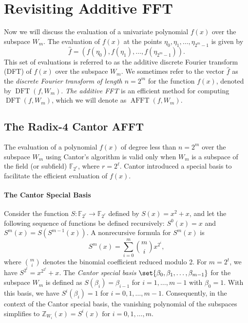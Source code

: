 \documentclass[11pt,runningheads]{llncs}
\DeclareMathOperator{\dft}{DFT} %
\DeclareMathOperator{\fft}{AFFT} %
\begin{document}
\section{Revisiting Additive FFT}
Now we will discuss the evaluation of a univariate polynomial $f(x)$ over the subspace $W_m$. The evaluation of $f(x)$ at the points $\eta_0, \eta_1, \ldots, \eta_{2^m-1}$ is given by 
\begin{equation*}
    \hat{f} = \left( f(\eta_0), f(\eta_1), \ldots, f(\eta_{2^m-1}) \right).
\end{equation*}
This set of evaluations is referred to as the additive discrete Fourier transform (DFT) of $f(x)$ over the subspace $W_m$. We sometimes refer to the vector $\hat{f}$ as the \textit{discrete Fourier transform of length $n=2^m$} for the function $f(x)$, denoted by $\dft(f, W_m)$. \textit{The additive FFT} is an efficient method for computing $\dft(f, W_m)$, which we will denote as $\fft(f, W_m)$.


\subsection{The Radix-4 Cantor AFFT}

The evaluation of a polynomial $f(x)$ of degree less than $n = 2^m$ over the subspace $W_m$ using Cantor's algorithm is valid only when $W_m$ is a subspace of the field (or subfield) $\mathbb{F}_{2^r}$, where $r = 2^\ell$. Cantor introduced a special basis to facilitate the efficient evaluation of $f(x)$.

\paragraph{The Cantor Special Basis}
Consider the function $S:\mathbb{F}_{2^r} \rightarrow \mathbb{F}_{2^r}$ defined by $S(x)=x^2+x$, and let the following sequence of functions be defined recursively: $S^{0}(x)=x$ and $S^{m}(x)=S(S^{m-1}(x))$.
A nonrecursive formula for $S^m(x)$ is $$S^{m}(x)=\sum_{i=0}^{m} \binom{m}{i} x^{2^i},$$ where $\binom{m}{i}$ denotes the binomial coefficient reduced modulo 2. For $m=2^{t}$, we have $S^{2^{t}}=x^{2^{2^{t}}}+x$. The \textit{Cantor special basis} $\set{\beta_{0},\beta_{1},\ldots,\beta_{m-1}}$ for the subspace $W_{m}$ is defined as $S(\beta_{i})=\beta_{i-1}$ for $i=1,\ldots,m-1$ with $\beta_{0}=1$. With this basis, we have $S^{i}(\beta_{i})=1$ for $i=0, 1, \ldots, m-1$. Consequently, in the context of the Cantor special basis, the vanishing polynomial of the subspaces simplifies to $\mathbb{Z}_{W_{i}}(x)=S^{i}(x) \text{ for } i=0,1,\ldots,m$.
\end{document}
